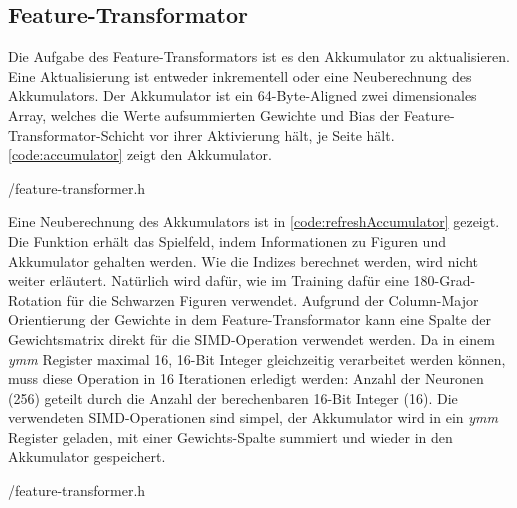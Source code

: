 \subsection{Feature-Transformator}

Die Aufgabe des Feature-Transformators ist es den Akkumulator zu aktualisieren. Eine Aktualisierung ist entweder inkrementell oder eine Neuberechnung des Akkumulators. Der Akkumulator ist ein 64-Byte-Aligned zwei dimensionales Array, welches die Werte aufsummierten Gewichte und Bias der Feature-Transformator-Schicht vor ihrer Aktivierung hält, je Seite hält. \autoref{code:accumulator} zeigt den Akkumulator.


{\srcloc/feature-transformer.h}

Eine Neuberechnung des Akkumulators ist in \autoref{code:refreshAccumulator} gezeigt. Die Funktion erhält das Spielfeld, indem Informationen zu \zb{} Figuren und Akkumulator gehalten werden. Wie die Indizes berechnet werden, wird nicht weiter erläutert. Natürlich wird dafür, wie im Training dafür eine 180-Grad-Rotation für die Schwarzen Figuren verwendet. Aufgrund der Column-Major Orientierung der Gewichte in dem Feature-Transformator kann eine Spalte der Gewichtsmatrix direkt für die \ac{SIMD}-Operation verwendet werden. Da in einem \emph{ymm} Register maximal 16, 16-Bit Integer gleichzeitig verarbeitet werden können, muss diese Operation in 16 Iterationen erledigt werden: Anzahl der Neuronen (256) geteilt durch die Anzahl der berechenbaren 16-Bit Integer (16). Die verwendeten \ac{SIMD}-Operationen sind simpel, der Akkumulator wird in ein \emph{ymm} Register geladen, mit einer Gewichts-Spalte summiert und wieder in den Akkumulator gespeichert.


{\srcloc/feature-transformer.h}

